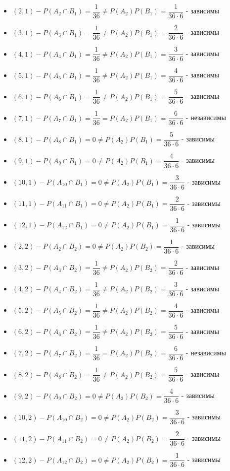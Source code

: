 \documentclass[a4paper,12pt]{article}
\begin{document}
\begin{itemize}
	\item \((2,1) -  P(A_2 \cap B_1) = \dfrac{1}{36} \neq P(A_2)P(B_1) = \dfrac{1}{36 \cdot 6} \) - зависимы
	\item \((3,1) -  P(A_3 \cap B_1) = \dfrac{1}{36} \neq P(A_2)P(B_1) = \dfrac{2}{36 \cdot 6} \) - зависимы
	\item \((4,1) -  P(A_4 \cap B_1) = \dfrac{1}{36} \neq P(A_2)P(B_1) = \dfrac{3}{36 \cdot 6} \) - зависимы
	\item \((5,1) -  P(A_5 \cap B_1) = \dfrac{1}{36} \neq P(A_2)P(B_1) = \dfrac{4}{36 \cdot 6} \) - зависимы
	\item \((6,1) -  P(A_6 \cap B_1) = \dfrac{1}{36} \neq P(A_2)P(B_1) = \dfrac{5}{36 \cdot 6} \) - зависимы
	\item \((7,1) -  P(A_7 \cap B_1) = \dfrac{1}{36} = P(A_2)P(B_1) = \dfrac{6}{36 \cdot 6} \) - независимы
	\item \((8,1) -  P(A_8 \cap B_1) = 0 \neq P(A_2)P(B_1) = \dfrac{5}{36 \cdot 6} \) - зависимы
	\item \((9,1) -  P(A_9 \cap B_1) = 0 \neq P(A_2)P(B_1) = \dfrac{4}{36 \cdot 6} \) - зависимы
	\item \((10,1) -  P(A_10 \cap B_1) = 0 \neq P(A_2)P(B_1) = \dfrac{3}{36 \cdot 6} \) - зависимы
	\item \((11,1) -  P(A_11 \cap B_1) = 0 \neq P(A_2)P(B_1) = \dfrac{2}{36 \cdot 6} \) - зависимы
	\item \((12,1) -  P(A_12 \cap B_1) = 0 \neq P(A_2)P(B_1) = \dfrac{1}{36 \cdot 6} \) - зависимы
\end{itemize}
\begin{itemize}
	\item \((2,2) -  P(A_2 \cap B_2) = 0 \neq P(A_2)P(B_2) = \dfrac{1}{36 \cdot 6} \) - зависимы
	\item \((3,2) -  P(A_3 \cap B_2) = \dfrac{1}{36} \neq P(A_2)P(B_2) = \dfrac{2}{36 \cdot 6} \) - зависимы
	\item \((4,2) -  P(A_4 \cap B_2) = \dfrac{1}{36} \neq P(A_2)P(B_2) = \dfrac{3}{36 \cdot 6} \) - зависимы
	\item \((5,2) -  P(A_5 \cap B_2) = \dfrac{1}{36} \neq P(A_2)P(B_2) = \dfrac{4}{36 \cdot 6} \) - зависимы
	\item \((6,2) -  P(A_6 \cap B_2) = \dfrac{1}{36} \neq P(A_2)P(B_2) = \dfrac{5}{36 \cdot 6} \) - зависимы
	\item \((7,2) -  P(A_7 \cap B_2) = \dfrac{1}{36} = P(A_2)P(B_2) = \dfrac{6}{36 \cdot 6} \) - независимы
	\item \((8,2) -  P(A_8 \cap B_2) = \dfrac{1}{36} \neq P(A_2)P(B_2) = \dfrac{5}{36 \cdot 6} \) - зависимы
	\item \((9,2) -  P(A_9 \cap B_2) = 0 \neq P(A_2)P(B_2) = \dfrac{4}{36 \cdot 6} \) - зависимы
	\item \((10,2) -  P(A_10 \cap B_2) = 0 \neq P(A_2)P(B_2) = \dfrac{3}{36 \cdot 6} \) - зависимы
	\item \((11,2) -  P(A_11 \cap B_2) = 0 \neq P(A_2)P(B_2) = \dfrac{2}{36 \cdot 6} \) - зависимы
	\item \((12,2) -  P(A_12 \cap B_2) = 0 \neq P(A_2)P(B_2) = \dfrac{1}{36 \cdot 6} \) - зависимы
\end{itemize}
\end{document}
